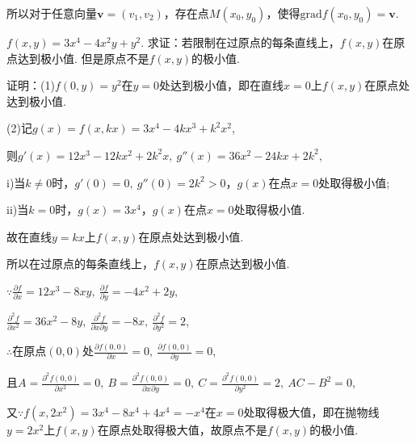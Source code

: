 \documentclass[12pt,UTF8]{ctexart}
\begin{document}
\begin{enumerate}
所以对于任意向量$\bm v=(v_1,v_2)$，存在点$M(x_0,y_0)$，使得$\mathrm{grad}f(x_0,y_0)=\bm v$.

$f(x,y)=3x^4-4x^2y+y^2$. 求证：若限制在过原点的每条直线上，$f(x,y)$在原点达到极小值. 但是原点不是$f(x,y)$的极小值.

证明：(1)$f(0,y)=y^2$在$y=0$处达到极小值，即在直线$x=0$上$f(x,y)$在原点处达到极小值.

(2)记$g(x)=f(x,kx)=3x^4-4kx^3+k^2x^2$,

则$g'(x)=12x^3-12kx^2+2k^2x,\ g''(x)=36x^2-24kx+2k^2$,

i)当$k\neq0$时，$g'(0)=0,\ g''(0)=2k^2>0$，$g(x)$在点$x=0$处取得极小值;

ii)当$k=0$时，$g(x)=3x^4$，$g(x)$在点$x=0$处取得极小值.

故在直线$y=kx$上$f(x,y)$在原点处达到极小值.

所以在过原点的每条直线上，$f(x,y)$在原点达到极小值.

$\because\frac{\partial f}{\partial x}=12x^3-8xy,\ \frac{\partial f}{\partial y}=-4x^2+2y$,

$\frac{\partial^2f}{\partial x^2}=36x^2-8y,\ \frac{\partial^2f}{\partial x\partial y}=-8x,\ \frac{\partial^2f}{\partial y^2}=2$,

$\therefore$在原点$(0,0)$处$\frac{\partial f(0,0)}{\partial x}=0,\ \frac{\partial f(0,0)}{\partial y}=0$,

且$A=\frac{\partial^2f(0,0)}{\partial x^2}=0,\ B=\frac{\partial^2f(0,0)}{\partial x\partial y}=0,\ C=\frac{\partial^2f(0,0)}{\partial y^2}=2,\ AC-B^2=0$,

又$\because f(x,2x^2)=3x^4-8x^4+4x^4=-x^4$在$x=0$处取得极大值，即在抛物线$y=2x^2$上$f(x,y)$在原点处取得极大值，故原点不是$f(x,y)$的极小值.
\end{enumerate}
\end{document}
